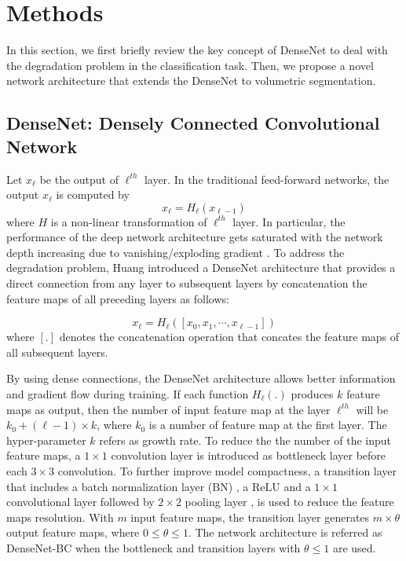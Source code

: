 \documentclass{llncs}
\begin{document}
\section{Methods}

In this section, we first briefly review the key concept of DenseNet \cite{huang2017densely} to deal with the degradation problem in the classification task. Then, we propose a novel network architecture that extends the DenseNet to volumetric segmentation.

\subsection{DenseNet: Densely Connected Convolutional Network}
Let $x_\ell$ be the output of $\ell^{th}$ layer. In the traditional feed-forward networks, the  output $x_\ell$ is computed by
\begin{equation}
    x_\ell=\mathit{H_{\ell}}(x_{\ell-1})
\end{equation}
where $\mathit{H}$ is a non-linear transformation of $\ell^{th}$ layer. In particular, the performance of the deep network architecture gets saturated with the network depth increasing due to vanishing/exploding gradient \cite{he2016deep}. To address the degradation problem, Huang \cite{huang2017densely} introduced a DenseNet architecture that provides a direct connection from any layer to subsequent layers by concatenation the feature maps of all preceding layers as follows:

\begin{equation}
    x_\ell=\mathit{H_\ell}([x_{0}, x_{1}, \cdots,  x_{\ell-1}])
\end{equation}
where $[.]$ denotes the concatenation operation that concates the feature maps of all subsequent layers. 

By using dense connections, the DenseNet architecture allows better information and gradient flow during training. If each function $\mathit{H_\ell}(.)$ produces $k$ feature maps as output, then the number of input feature map at the layer $\ell^{th}$ will be $k_0+(\ell -1)\times k$, where $k_0$ is a number of feature map at the first layer.  The hyper-parameter $k$ refers as growth rate. To reduce the the number of the input feature maps, a $1 \times 1$ convolution layer is introduced as bottleneck layer before each $3 \times 3$ convolution. To further improve model compactness, a transition layer that includes a batch normalization layer (BN) \cite{ioffe2015batch}, a ReLU \cite{glorot2011deep} and a $1 \times 1$ convolutional layer followed by $2 \times 2$ pooling layer \cite{lecun1998gradient}, is used to reduce the feature maps resolution. With $m$ input feature maps, the transition layer generates $m\times\theta$ output feature maps, where $0 \le \theta \le 1$. The network architecture is referred as DenseNet-BC when the bottleneck and transition layers with $\theta \le 1$ are used.
\end{document}
